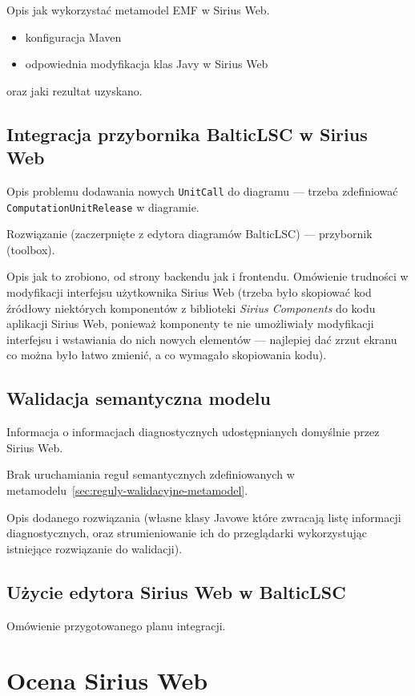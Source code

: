 Opis jak wykorzystać metamodel EMF w Sirius Web.

\begin{itemize}
	\item konfiguracja Maven
	\item odpowiednia modyfikacja klas Javy w Sirius Web
\end{itemize}

\noindent oraz jaki rezultat uzyskano.

\section{Integracja przybornika BalticLSC w Sirius Web}

Opis problemu dodawania nowych \texttt{UnitCall} do diagramu --- trzeba
zdefiniować \texttt{ComputationUnitRelease} w diagramie.

Rozwiązanie (zaczerpnięte z edytora diagramów BalticLSC) --- przybornik
(toolbox).

Opis jak to zrobiono, od strony backendu jak i frontendu. Omówienie trudności w
modyfikacji interfejsu użytkownika Sirius Web (trzeba było skopiować kod
źródłowy niektórych komponentów z biblioteki \textit{Sirius Components} do kodu
aplikacji Sirius Web, ponieważ komponenty te nie umożliwiały modyfikacji
interfejsu i wstawiania do nich nowych elementów --- najlepiej dać zrzut ekranu
co można było łatwo zmienić, a co wymagało skopiowania kodu).

\section{Walidacja semantyczna modelu}

Informacja o informacjach diagnostycznych udostępnianych domyślnie przez Sirius
Web.

Brak uruchamiania reguł semantycznych zdefiniowanych w
metamodelu~\ref{sec:reguly-walidacyjne-metamodel}.

Opis dodanego rozwiązania (własne klasy Javowe które zwracają listę informacji
diagnostycznych, oraz strumieniowanie ich do przeglądarki wykorzystując
istniejące rozwiązanie do walidacji).

\section{Użycie edytora Sirius Web w BalticLSC}

Omówienie przygotowanego planu integracji.

\chapter{Ocena Sirius Web}

